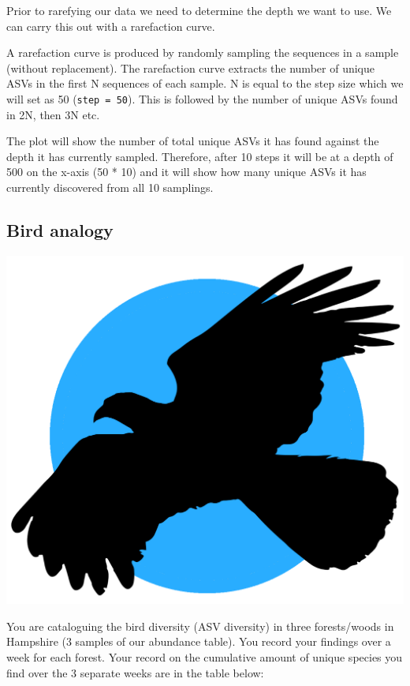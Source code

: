 \documentclass[
]{book}
\begin{document}
Prior to rarefying our data we need to determine the depth we want to
use. We can carry this out with a rarefaction curve.

A rarefaction curve is produced by randomly sampling the sequences in a
sample (without replacement). The rarefaction curve extracts
the number of unique ASVs in the first N sequences of each sample.
N is equal to the step size which
we will set as 50 (\texttt{step\ =\ 50}).
This is followed by the number of unique ASVs found in 2N, then 3N etc.

The plot will show the number of total unique ASVs it has found
against the depth it has currently sampled. Therefore, after 10 steps it
will be at a depth of 500 on the x-axis (50 * 10) and it will show how
many unique ASVs it has currently discovered from all 10 samplings.

\hypertarget{bird-analogy}{%
\subsection{Bird analogy}\label{bird-analogy}}

\includegraphics{figures/ibyster.png}

You are cataloguing the bird diversity (ASV diversity) in three forests/woods in Hampshire (3 samples of our abundance table).
You record your findings over a week for each forest.
Your record on the cumulative amount of unique species you find over the 3 separate weeks are in the table below:
\end{document}

